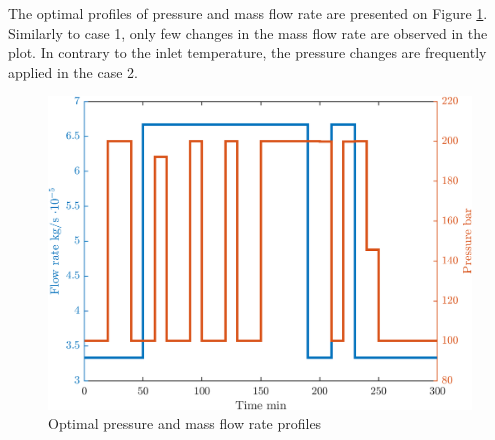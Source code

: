 \documentclass[../Article_Sensitivity_Analsysis.tex]{subfiles}
\begin{document}
	The optimal profiles of pressure and mass flow rate are presented on Figure \ref{fig:profile_P}. Similarly to case 1, only few changes in the mass flow rate are observed in the plot. In contrary to the inlet temperature, the pressure changes are frequently applied in the case 2. 
	
	\begin{figure}[h!]
		\centering
		\includegraphics[width=\columnwidth]{Figures/Results/Profile_P_1.png}	
		\caption{Optimal pressure and mass flow rate profiles}
		\label{fig:profile_P}
	\end{figure}
	
\end{document}
